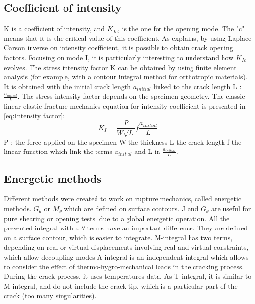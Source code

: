 \subsection{Coefficient of intensity}

K is a coefficient of intensity, and $K_{Ic}$, is the one for the opening mode. The "c" means that it is the critical value of this coefficient. As \parencite{Reference10} explains, by using Laplace Carson inverse on intensity coefficient, it is possible to obtain crack opening factors. Focusing on mode I, it is particularly interesting to understand how $K_{Ic}$ evolves. The stress intensity factor K can be obtained by using finite element analysis (for example, with a contour integral method for orthotropic materials). It is obtained with the initial crack length $a_{initial}$ linked to the crack length L : $\frac{a_{initial}}{L}$.
The stress intensity factor depends on the specimen geometry. The classic linear elastic fracture mechanics equation for intensity coefficient is presented in \ref{eq:Intensity factor}:
\begin{equation}
	K_{I}=\frac{P}{W\sqrt{L}}f\frac{a_{initial}}{L} 	
	\label{eq:Intensity factor}
\end{equation} 						
P : the force applied on the specimen 
W the thickness
L the crack length 
f the linear function which link the terms $a_{initial}$ and L in $\frac{a_{initial}}{L}$. 



\subsection{Energetic methods}

Different methods were created to work on rupture mechanics, called energetic methods. $G_{\theta}$ or $M_{\theta}$ which are defined on surface contours. J and $G_{\theta}$ are useful for pure shearing or opening tests, due to a global energetic operation. All the presented integral with a $\theta$ terms have an important difference. They are defined on a surface contour, which is easier to integrate. M-integral has two terms, depending on real or virtual displacements involving real and virtual constraints, which allow decoupling modes
A-integral is an independent integral which allows to consider the effect of thermo-hygro-mechanical loads in the cracking process. During the crack process, it uses temperatures data. As T-integral, it is similar to M-integral, and do not include the crack tip, which is a particular part of the crack (too many singularities).

